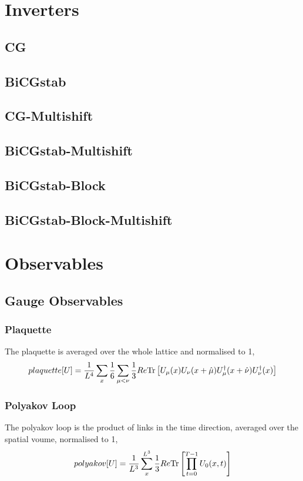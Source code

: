 \documentclass[a4paper,12pt]{article}
\newcommand{\Tr}{{\rm Tr}}
\begin{document}
\section{Inverters}
\subsection{CG}
\subsection{BiCGstab}
\subsection{CG-Multishift}
\subsection{BiCGstab-Multishift}
\subsection{BiCGstab-Block}
\subsection{BiCGstab-Block-Multishift}

\section{Observables}
\subsection{Gauge Observables}
\subsubsection{Plaquette}
The plaquette is averaged over the whole lattice and normalised to 1,
\begin{equation}
 plaquette[U] = \frac{1}{L^4} \sum_x \frac{1}{6}\sum_{\mu<\nu} \frac{1}{3} Re \Tr \left[ U_{\mu}(x)  U_{\nu}(x+\hat\mu)  U_{\mu}^{\dagger}(x+\hat\nu)  U_{\nu}^{\dagger}(x)\right]
\end{equation}

\subsubsection{Polyakov Loop}
The polyakov loop is the product of links in the time direction, averaged over the spatial voume, normalised to 1,
\begin{equation}
 polyakov[U] = \frac{1}{L^3} \sum_x^{L^3} \frac{1}{3} Re \Tr \left[\prod_{t=0}^{T-1} U_{0}(x, t)\right]
\end{equation}
\end{document}
